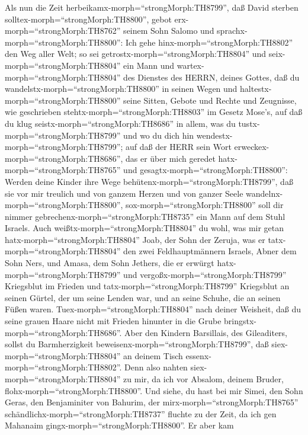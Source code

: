  Als nun die Zeit herbeikamx-morph=``strongMorph:TH8799'',
daß David sterben solltex-morph=``strongMorph:TH8800'', gebot
erx-morph=``strongMorph:TH8762'' seinem Sohn Salomo und
sprachx-morph=``strongMorph:TH8800'':  Ich gehe
hinx-morph=``strongMorph:TH8802'' den Weg aller Welt; so sei
getrostx-morph=``strongMorph:TH8804'' und
seix-morph=``strongMorph:TH8804'' ein Mann  und
wartex-morph=``strongMorph:TH8804'' des Dienstes des HERRN, deines
Gottes, daß du wandelstx-morph=``strongMorph:TH8800'' in seinen Wegen
und haltestx-morph=``strongMorph:TH8800'' seine Sitten, Gebote und
Rechte und Zeugnisse, wie geschrieben
stehtx-morph=``strongMorph:TH8803'' im Gesetz Mose's, auf daß du klug
seistx-morph=``strongMorph:TH8686'' in allem, was du
tustx-morph=``strongMorph:TH8799'' und wo du dich hin
wendestx-morph=``strongMorph:TH8799'';  auf daß der HERR
sein Wort erweckex-morph=``strongMorph:TH8686'', das er über mich
geredet hatx-morph=``strongMorph:TH8765'' und
gesagtx-morph=``strongMorph:TH8800'': Werden deine Kinder ihre Wege
behütenx-morph=``strongMorph:TH8799'', daß sie vor mir treulich und von
ganzem Herzen und von ganzer Seele
wandelnx-morph=``strongMorph:TH8800'', sox-morph=``strongMorph:TH8800''
soll dir nimmer gebrechenx-morph=``strongMorph:TH8735'' ein Mann auf dem
Stuhl Israels.  Auch weißtx-morph=``strongMorph:TH8804'' du
wohl, was mir getan hatx-morph=``strongMorph:TH8804'' Joab, der Sohn der
Zeruja, was er tatx-morph=``strongMorph:TH8804'' den zwei
Feldhauptmännern Israels, Abner dem Sohn Ners, und Amasa, dem Sohn
Jethers, die er erwürgt hatx-morph=``strongMorph:TH8799'' und
vergoßx-morph=``strongMorph:TH8799'' Kriegsblut im Frieden und
tatx-morph=``strongMorph:TH8799'' Kriegsblut an seinen Gürtel, der um
seine Lenden war, und an seine Schuhe, die an seinen Füßen waren.
 Tuex-morph=``strongMorph:TH8804'' nach deiner Weisheit, daß
du seine grauen Haare nicht mit Frieden hinunter in die Grube
bringstx-morph=``strongMorph:TH8686''.  Aber den Kindern
Barsillais, des Gileaditers, sollst du Barmherzigkeit
beweisenx-morph=``strongMorph:TH8799'', daß
siex-morph=``strongMorph:TH8804'' an deinem Tisch
essenx-morph=``strongMorph:TH8802''. Denn also nahten
siex-morph=``strongMorph:TH8804'' zu mir, da ich vor Absalom, deinem
Bruder, flohx-morph=``strongMorph:TH8800''.  Und siehe, du
hast bei mir Simei, den Sohn Geras, den Benjaminiter von Bahurim, der
mirx-morph=``strongMorph:TH8765''
schändlichx-morph=``strongMorph:TH8737'' fluchte zu der Zeit, da ich gen
Mahanaim gingx-morph=``strongMorph:TH8800''. Er aber kam
